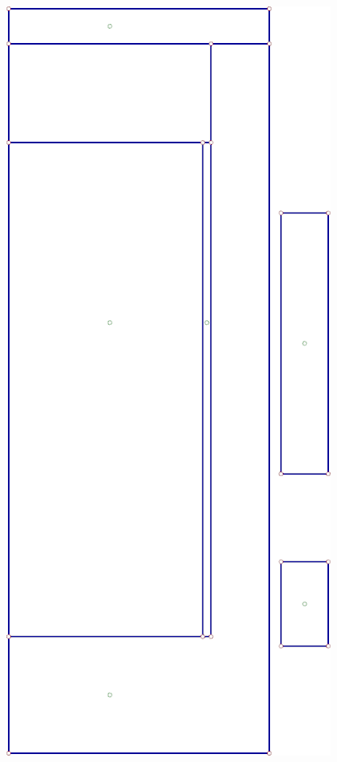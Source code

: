 \documentclass[portrait, a1paper, fontscale=0.5]{baposter}
\begin{document}
\begin{poster}
{\begin{center}
\begin{minipage}{4em}
	\end{minipage}
	\begin{minipage}{5em}
		\centering
		\includegraphics[scale=0.125]{optimization/variant_2.png}
	\end{minipage}
	\begin{minipage}{9em}
		\centering

\end{minipage}
\end{center}}
\end{poster}
\end{document}
